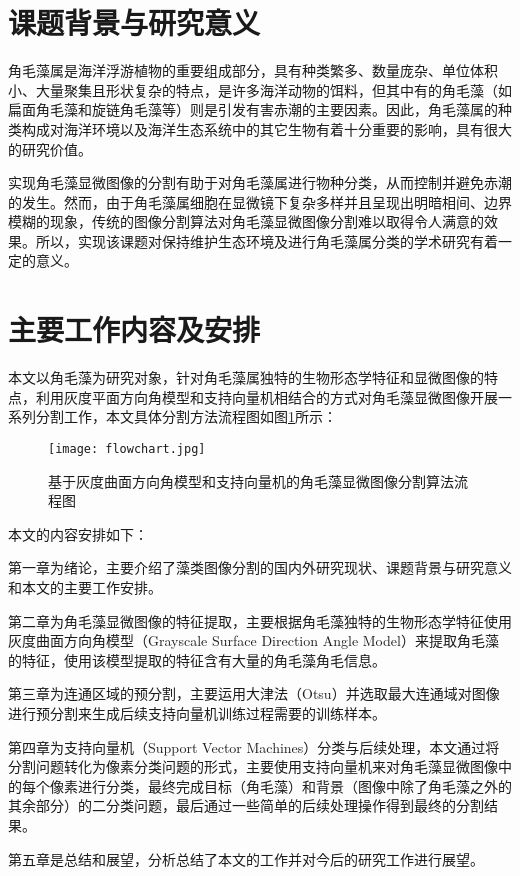 \section{课题背景与研究意义}
角毛藻属是海洋浮游植物的重要组成部分，具有种类繁多、数量庞杂、单位体积小、大量聚集且形状复杂的特点，是许多海洋动物的饵料，但其中有的角毛藻（如扁面角毛藻和旋链角毛藻等）则是引发有害赤潮的主要因素。因此，角毛藻属的种类构成对海洋环境以及海洋生态系统中的其它生物有着十分重要的影响，具有很大的研究价值。

实现角毛藻显微图像的分割有助于对角毛藻属进行物种分类，从而控制并避免赤潮的发生。然而，由于角毛藻属细胞在显微镜下复杂多样并且呈现出明暗相间、边界模糊的现象，传统的图像分割算法对角毛藻显微图像分割难以取得令人满意的效果。所以，实现该课题对保持维护生态环境及进行角毛藻属分类的学术研究有着一定的意义。


 \section{主要工作内容及安排}
 本文以角毛藻为研究对象，针对角毛藻属独特的生物形态学特征和显微图像的特点，利用灰度平面方向角模型和支持向量机相结合的方式对角毛藻显微图像开展一系列分割工作，本文具体分割方法流程图如图\ref{flowchart}所示：

   \begin{figure}[ht!]
   \centering
  \texttt{[image: flowchart.jpg]}
  \caption{基于灰度曲面方向角模型和支持向量机的角毛藻显微图像分割算法流程图}
    \label{flowchart}
 \end{figure}

本文的内容安排如下：

第一章为绪论，主要介绍了藻类图像分割的国内外研究现状、课题背景与研究意义和本文的主要工作安排。

第二章为角毛藻显微图像的特征提取，主要根据角毛藻独特的生物形态学特征使用灰度曲面方向角模型（Grayscale Surface Direction Angle Model）来提取角毛藻的特征，使用该模型提取的特征含有大量的角毛藻角毛信息。

第三章为连通区域的预分割，主要运用大津法（Otsu）并选取最大连通域对图像进行预分割来生成后续支持向量机训练过程需要的训练样本。

第四章为支持向量机（Support Vector Machines）分类与后续处理，本文通过将分割问题转化为像素分类问题的形式，主要使用支持向量机来对角毛藻显微图像中的每个像素进行分类，最终完成目标（角毛藻）和背景（图像中除了角毛藻之外的其余部分）的二分类问题，最后通过一些简单的后续处理操作得到最终的分割结果。

第五章是总结和展望，分析总结了本文的工作并对今后的研究工作进行展望。

